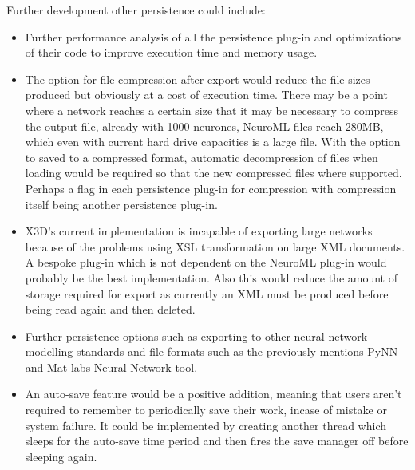 \documentclass[12pt,twoside]{article}
\newcommand\liststyleLiii{%
\renewcommand\labelitemi{{\textbullet}}
\renewcommand\labelitemii{${\circ}$}
\renewcommand\labelitemiii{${\blacksquare}$}
\renewcommand\labelitemiv{{\textbullet}}
}
\begin{document}
\bigskip

{\mdseries\upshape
Further development other persistence could include:}

\liststyleLiii
\begin{itemize}
\item {\mdseries\upshape
Further performance analysis of all the persistence plug{}-in and
optimizations of their code to improve execution time and memory
usage.}
\item {\mdseries\upshape
The option for file compression after export would reduce the file sizes
produced but obviously at a cost of execution time. There may be a
point where a network reaches a certain size that it may be necessary
to compress the output file, already with 1000 neurones, NeuroML files
reach 280MB, which even with current hard drive capacities is a large
file. With the option to saved to a compressed format, automatic
decompression of files when loading would be required so that the new
compressed files where supported. Perhaps a flag in each persistence
plug{}-in for compression with compression itself being another
persistence plug{}-in.}
\item {\mdseries\upshape
X3D's current implementation is incapable of exporting
large networks because of the problems using XSL transformation on
large XML documents. A bespoke plug{}-in which is not dependent on the
NeuroML plug{}-in would probably be the best implementation. Also this
would reduce the amount of storage required for export as currently an
XML must be produced before being read again and then deleted.}
\item {\mdseries\upshape
Further persistence options such as exporting to other neural network
modelling standards and file formats such as the previously mentions
PyNN and Mat{}-labs Neural Network tool.}
\item {\mdseries\upshape
An auto{}-save feature would be a positive addition, meaning that users
aren't required to remember to periodically save their
work, incase of mistake or system failure. It could be implemented by
creating another thread which sleeps for the auto{}-save time period
and then fires the save manager off before sleeping again.}
\end{itemize}
\end{document}
